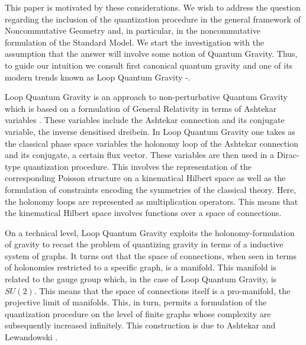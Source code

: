 \documentclass[12pt]{article}
\begin{document}




This paper is motivated by these considerations. We wish to address the question regarding the inclusion of the quantization procedure in the general framework of Noncommutative Geometry and, in particular, in the noncommutative formulation of the Standard Model. We start the investigation with the assumption that the answer will involve some notion of Quantum Gravity. Thus, to guide our intuition we consult first canonical quantum gravity and one of its modern trends known as Loop Quantum Gravity \cite{Rovelli:1987df}-\cite{Ashtekar:2004eh}. 

Loop Quantum Gravity is an approach to non-perturbative Quantum Gravity which is based on a formulation of General Relativity in terms of Ashtekar variables \cite{Ashtekar:1986yd,Ashtekar:1987gu}. These variables include the Ashtekar connection and its conjugate variable, the inverse densitised dreibein. In Loop Quantum Gravity one takes as the classical phase space variables the holonomy loop of the Ashtekar connection and its conjugate, a certain flux vector.
These variables are then used in a Dirac-type quantization procedure. This involves the representation of the corresponding Poisson structure on a kinematical Hilbert space as well as the formulation of constraints encoding the symmetries of the classical theory. Here, the holonomy loops are represented as multiplication operators. This means that the kinematical Hilbert space involves functions over a space of connections.


On a technical level, Loop Quantum Gravity exploits the holonomy-formulation of gravity to recast the problem of quantizing gravity in terms of a inductive system of graphs. It turns out that the space of connections, when seen in terms of holonomies restricted to a specific graph, is a manifold. This manifold is related to the gauge group which, in the case of Loop Quantum Gravity, is $SU(2)$. This means that the space of connections itself is a pro-manifold, the projective limit of manifolds. This, in turn, permits a formulation of the quantization procedure on the level of finite graphs whose complexity are subsequently increased infinitely. This construction is due to Ashtekar and Lewandowski \cite{Ashtekar:1993wf,Ashtekar:1994wa}.
\end{document}
